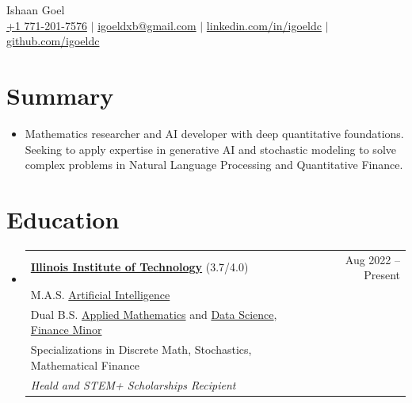 \documentclass[letterpaper,10pt]{article}
\newcommand\indentsize{10pt}
\newcommand\vspacesize{-10pt}
\newcommand{\resumeSubHeadingListStart}{\begin{itemize}[leftmargin=0.15in, label=]}
\newcommand{\resumeSubHeadingListEnd}{\end{itemize}}
\begin{document}
\begin{center}
    \huge Ishaan Goel \\ \vspace{2pt}
    \large
    \href{tel:17712017576}{+1 771-201-7576}
    $|$ \href{mailto:igoeldxb@gmail.com}{igoeldxb@gmail.com}
    $|$ \href{https://linkedin.com/in/igoeldc/}{linkedin.com/in/igoeldc}
    $|$ \href{https://github.com/igoeldc}{github.com/igoeldc}
\end{center}

\section{Summary}
  \resumeSubHeadingListStart
    \item{Mathematics researcher and AI developer with deep quantitative foundations. Seeking to apply expertise in generative AI and stochastic modeling to solve complex problems in Natural Language Processing and Quantitative Finance.}
  \resumeSubHeadingListEnd
\vspace{\vspacesize}

\newcommand{\resumeEducationHeading}[7]{
  \item
    \begin{tabular*}{0.97\textwidth}[t]{l@{\extracolsep{\fill}}r}
      \textbf{#1} {#2} & #3 \\
      \hspace{\indentsize} #4 \\
      \hspace{\indentsize} #5 \\
      \hspace{20pt} #6 \\
      \hspace{40pt} \textit{#7} \\
    \end{tabular*}
}

\section{Education}
  \resumeSubHeadingListStart
    \resumeEducationHeading
      {\href{https://www.iit.edu/}{Illinois Institute of Technology}}{(3.7/4.0)}{Aug 2022 -- Present}
      {M.A.S. \href{https://catalog.iit.edu/graduate/colleges/computing/computer-science/master-artificial-intelligence/\#overviewtext}{Artificial Intelligence}}
      {Dual B.S. \href{https://catalog.iit.edu/undergraduate/colleges/computing/applied-mathematics/bs/\#text}{Applied Mathematics} and \href{https://catalog.iit.edu/undergraduate/colleges/computing/computer-science/\#:~:text=The\%20B.S.\%20in\%20Data,be\%20successful\%20data\%20science\%20professionals.}{Data Science}, \href{https://catalog.iit.edu/undergraduate/colleges/business/minor-finance/\#:~:text=business\%20schools\%20worldwide.-,Required\%20Courses,-Course\%20List}{Finance Minor}}
      {Specializations in Discrete Math, Stochastics, Mathematical Finance}
      {Heald and STEM+ Scholarships Recipient}
  \resumeSubHeadingListEnd
  
\end{document}
